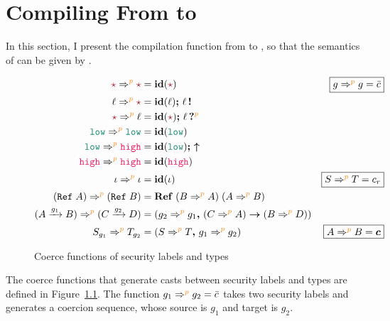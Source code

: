 \chapter{Compiling From \Surface to \CC}
\label{ch:compile}

In this section, I present the compilation function from \Surface to \CC, so
that the semantics of \Surface can be given by \CC.

\begin{figure}[tbp]
  \raggedright
  \begin{align*}
    \unk \Rightarrow^{\bl{p}} \unk &= \id{\unk} & \fbox{$g\Rightarrow^{\bl{p}}g=\bar{c}$} \\
    \ell \Rightarrow^{\bl{p}} \unk &= \id{\ell} \seq \inj{\ell} \\
    \unk \Rightarrow^{\bl{p}} \ell &= \id{\unk} \seq \proj{\ell}{\bl{p}} \\
    \low \Rightarrow^{\bl{p}} \low &= \id{\low} \\
    \low \Rightarrow^{\bl{p}} \high &= \id{\low} \seq \up \\
    \high \Rightarrow^{\bl{p}} \high &= \id{\high} \\
    \iota \Rightarrow^{\bl{p}} \iota &= \id{\iota} & \fbox{$S \Rightarrow^{\bl{p}} T = c_r$} \\
    (\Refer{A}) \Rightarrow^{\bl{p}} (\Refer{B}) &= \refco{(B \Rightarrow^{\bl{p}} A)}{(A \Rightarrow^{\bl{p}} B)} \\
    (\Fun{A}{g_1}{B}) \Rightarrow^{\bl{p}} (\Fun{C}{g_2}{D}) &= (\funco{g_2 \Rightarrow^{\bl{p}} g_1}{(C \Rightarrow^{\bl{p}} A)}{(B \Rightarrow^{\bl{p}} D)}) \\
    S_{g_1} \Rightarrow^{\bl{p}} T_{g_2} &= (\coerc{S \Rightarrow^{\bl{p}} T}{g_1 \Rightarrow^{\bl{p}} g_2}) & \fbox{$A \Rightarrow^{\bl{p}} B = \bm{c}$}
  \end{align*}
  \caption{Coerce functions of security labels and types}
  \label{fig:coerce}
\end{figure}

The coerce functions that generate casts between security labels and types are
defined in Figure~\ref{fig:coerce}. The function
$g_1\Rightarrow^{\bl{p}}g_2=\bar{c}$ takes two security labels and generates a
coercion sequence, whose source is $g_1$ and target is $g_2$.

